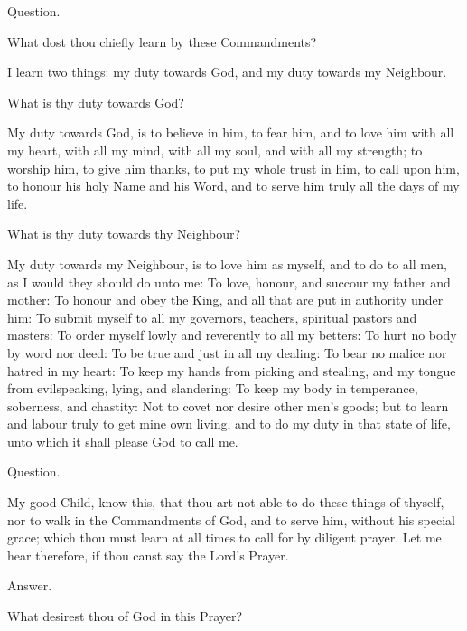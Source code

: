 \begin{rubric}
Question.
\end{rubric}

What dost thou chiefly learn by these Commandments?

   I learn two things: my duty towards God, and my duty towards my Neighbour.

 What is thy duty towards God?

   My duty towards God, is to believe in him, to fear him, and to love him with all my heart, with all my mind, with all my soul, and with all my strength; to worship him, to give him thanks, to put my whole trust in him, to call upon him, to honour his holy Name and his Word, and to serve him truly all the days of my life.

 What is thy duty towards thy Neighbour?

   My duty towards my Neighbour, is to love him as myself, and to do to all men, as I would they should do unto me: To love, honour, and succour my father and mother: To honour and obey the King, and all that are put in authority under him: To submit myself to all my governors, teachers, spiritual pastors and masters: To order myself lowly and reverently to all my betters: To hurt no body by word nor deed: To be true and just in all my dealing: To bear no malice nor hatred in my heart: To keep my hands from picking and stealing, and my tongue from evilspeaking, lying, and slandering: To keep my body in temperance, soberness, and chastity: Not to covet nor desire other men's goods; but to learn and labour truly to get mine own living, and to do my duty in that state of life, unto which it shall please God to call me.

\begin{rubric}
Question.
\end{rubric}

My good Child, know this, that thou art not able to do these things of thyself, nor to walk in the Commandments of God, and to serve him, without his special grace; which thou must learn at all times to call for by diligent prayer. Let me hear therefore, if thou canst say the Lord's Prayer.

\begin{rubric}
Answer.
\end{rubric}



 What desirest thou of God in this Prayer?

